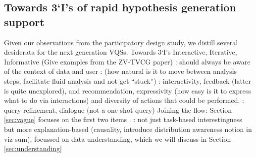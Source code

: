  \subsection{Towards 3‘I’s of rapid hypothesis generation support}
Given our observations from the participatory design study, we distill several desiderata for the next generation VQSs. 
Towards 3‘I’s Interactive, Iterative, Informative (Give examples from the ZV-TVCG paper)
: should always be aware of the context of data and user 
:
 (how natural is it to move between analysis steps, facilitate fluid analysis and not get ``stuck'') : interactivity, feedback (latter is quite unexplored), and recommendation, expressivity (how easy is it to express what to do via interactions) and diversity of actions that could be performed.
: query refinement, dialogue (not a one-shot query)
Joining the flow: Section \ref{sec:vague} focuses on the first two items .
: not just task-based interestingness but more explanation-based (causality, introduce distribution awareness notion in viz-sum), focussed on data understanding, which we will discuss in Section \ref{sec:understanding}
